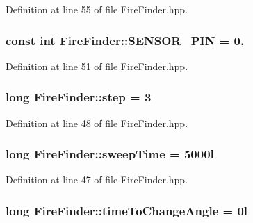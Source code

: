Definition at line 55 of file Fire\-Finder.\-hpp.

\hypertarget{classFireFinder_a5afc5290c8ba58893228414ba5965ed3}{
\subsubsection[{S\-E\-N\-S\-O\-R\-\_\-\-P\-I\-N}]{\setlength{\rightskip}{0pt plus 5cm}const int Fire\-Finder\-::\-S\-E\-N\-S\-O\-R\-\_\-\-P\-I\-N = 0\hspace{0.3cm}{\ttfamily [static]}, {\ttfamily [private]}}}\label{classFireFinder_a5afc5290c8ba58893228414ba5965ed3}


Definition at line 51 of file Fire\-Finder.\-hpp.

\hypertarget{classFireFinder_ad482526cf32997919cbc31f61d12065d}{
\subsubsection[{step}]{\setlength{\rightskip}{0pt plus 5cm}long Fire\-Finder\-::step = 3\hspace{0.3cm}{\ttfamily [private]}}}\label{classFireFinder_ad482526cf32997919cbc31f61d12065d}


Definition at line 48 of file Fire\-Finder.\-hpp.

\hypertarget{classFireFinder_aaa38192d82bc4120129b72fee61f72f1}{
\subsubsection[{sweep\-Time}]{\setlength{\rightskip}{0pt plus 5cm}long Fire\-Finder\-::sweep\-Time = 5000l\hspace{0.3cm}{\ttfamily [private]}}}\label{classFireFinder_aaa38192d82bc4120129b72fee61f72f1}


Definition at line 47 of file Fire\-Finder.\-hpp.

\hypertarget{classFireFinder_a97b1a598ddb7886feb4a96a4931cc103}{
\subsubsection[{time\-To\-Change\-Angle}]{\setlength{\rightskip}{0pt plus 5cm}long Fire\-Finder\-::time\-To\-Change\-Angle = 0l\hspace{0.3cm}{\ttfamily [private]}}}\label{classFireFinder_a97b1a598ddb7886feb4a96a4931cc103}


